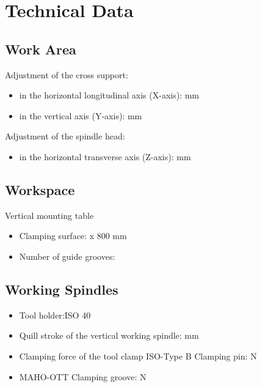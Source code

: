 
\section{Technical Data}

\subsection{Work Area}
Adjustment of the cross support:
\begin{itemize}
    \item in the horizontal longitudinal axis (X-axis):  mm
    \item in the vertical axis (Y-axis):  mm
\end{itemize}

\noindent Adjustment of the spindle head:
\begin{itemize}
    \item in the horizontal transverse axis (Z-axis):  mm
\end{itemize}

\subsection{Workspace}
Vertical mounting table \footnotemark[4]
\begin{itemize}
    \item Clamping surface:  x 800 mm
    \item Number of guide grooves: 
\end{itemize}


\subsection{Working Spindles}
\begin{itemize}
    \item Tool holder:\footnotemark[5] \dotfill ISO 40
    \item Quill stroke of the vertical working spindle:  mm
    \item Clamping force of the tool clamp ISO-Type B Clamping pin: \dotfill N \footnotemark[6]
    \item MAHO-OTT Clamping groove: \dotfill N \footnotemark[6]
\end{itemize}

